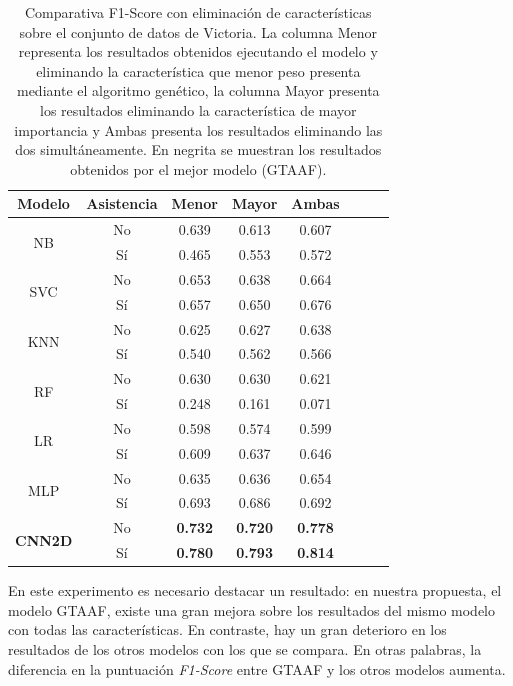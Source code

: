 \documentclass{uathesis-es}
\begin{document}
{\begin{table}[H]
\begin{center}
\begin{tabular}{|c|c||c|c|c|c|c|c|}
        \textbf{Modelo} & Asistencia & Menor & Mayor & Ambas
        \\ \hline \hline

        \multirow{2}{*}{NB} &
            No & 0.639 & 0.613 & 0.607\\ &
            Sí  & 0.465 & 0.553 & 0.572 \\ \hline \hline
        \multirow{2}{*}{SVC} &
            No & 0.653 & 0.638 & 0.664\\ &
            Sí  & 0.657 & 0.650 & 0.676 \\ \hline \hline
        \multirow{2}{*}{KNN} &
            No & 0.625 & 0.627 & 0.638\\ &
            Sí  & 0.540 & 0.562 & 0.566 \\ \hline \hline
        \multirow{2}{*}{RF} &
            No & 0.630 & 0.630 & 0.621\\ &
            Sí  & 0.248 & 0.161 & 0.071 \\ \hline \hline
        \multirow{2}{*}{LR} &
            No & 0.598 & 0.574 & 0.599\\ &
            Sí  & 0.609 & 0.637 & 0.646 \\ \hline \hline
        \multirow{2}{*}{MLP} &
            No & 0.635 & 0.636 & 0.654\\ &
            Sí  & 0.693 & 0.686 & 0.692 \\ \hline \hline
        \multirow{2}{*}{\textbf{CNN2D}} &
            No & \textbf{0.732} & \textbf{0.720} & \textbf{0.778}\\ &
            Sí  & \textbf{0.780} & \textbf{0.793} & \textbf{0.814} \\ \hline \hline
        \end{tabular}
    \end{center}
    \caption{Comparativa F1-Score con eliminación de características sobre el conjunto de datos de Victoria. La columna Menor representa los resultados obtenidos ejecutando el modelo y eliminando la característica que menor peso presenta mediante el algoritmo genético, la columna Mayor presenta los resultados eliminando la característica de mayor importancia y Ambas presenta los resultados eliminando las dos simultáneamente. En negrita se muestran los resultados obtenidos por el mejor modelo (GTAAF).}
    \label{Victorialoss}
\end{table}

En este experimento es necesario destacar un resultado: en nuestra propuesta, el modelo GTAAF, existe una gran mejora sobre los resultados del mismo modelo con todas las características. En contraste, hay un gran deterioro en los resultados de los otros modelos con los que se compara. En otras palabras, la diferencia en la puntuación \textit{F1-Score} entre GTAAF y los otros modelos aumenta.

}
\end{document}
